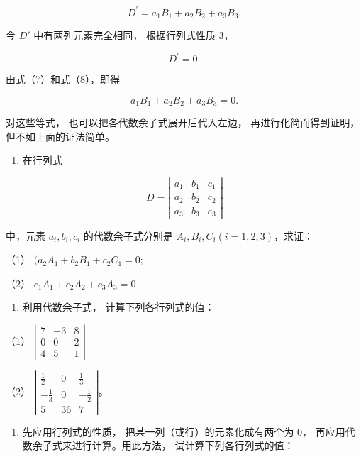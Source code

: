 \[
D ^ {\prime} = a _ {1} B _ {1} + a _ {2} B _ {2} + a _ {3} B _ {3}. \tag {7}
\]

今 \(D'\) 中有两列元素完全相同， 根据行列式性质 3，

\[
D ^ {\prime} = 0. \tag {8}
\]

由式（7）和式（8），即得

\[
a _ {1} B _ {1} + a _ {2} B _ {2} + a _ {3} B _ {3} = 0.
\]

 对这些等式， 也可以把各代数余子式展开后代入左边，
再进行化简而得到证明， 但不如上面的证法简单。

\begin{enumerate}
\item
  在行列式
\end{enumerate}

\[
D = \left| \begin{array}{lll} a _ {1} & b _ {1} & c _ {1} \\ a _ {2} & b _ {2} & c _ {2} \\ a _ {3} & b _ {3} & c _ {3} \end{array} \right|
\]

中，元素 \(a_{i}, b_{i}, c_{i}\) 的代数余子式分别是
\(A_{i}, B_{i}, C_{i} (i = 1, 2, 3)\)，求证：

（1） \((a_{2}A_{1} + b_{2}B_{1} + c_{2}C_{1} = 0;\)

（2） \(c_{1}A_{1} + c_{2}A_{2} + c_{3}A_{3} = 0\)

\begin{enumerate}[start=2]
\item
  利用代数余子式， 计算下列各行列式的值：
\end{enumerate}

（1）
\(\left| \begin{array}{ccc}7 & -3 & 8\\ 0 & 0 & 2\\ 4 & 5 & 1 \end{array} \right|\)

（2）
\(\left| \begin{array}{ccc} \frac{1}{2} & 0 & \frac{1}{3} \\ -\frac{1}{3} & 0 & -\frac{1}{2} \\ 5 & 36 & 7 \end{array} \right|\)。

\begin{enumerate}[start=3]
\item
  先应用行列式的性质， 把某一列（或行）的元素化成有两个为 0，
  再应用代数余子式来进行计算。用此方法， 试计算下列各行列式的值：
\end{enumerate}

